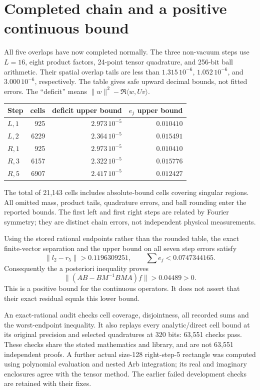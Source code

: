 \documentclass[11pt,a4paper]{article}
\begin{document}
\newpage
\section{Completed chain and a positive continuous bound}
All five overlaps have now completed normally. The three non-vacuum
steps use $L=16$, eight product factors, 24-point tensor quadrature,
and 256-bit ball arithmetic. Their spatial overlap tails are less
than $1.315\,10^{-6}$, $1.052\,10^{-6}$, and $3.000\,10^{-6}$,
respectively. The table gives safe upward decimal bounds, not fitted
errors. The ``deficit'' means $\|w\|^2-\Re\langle w,Uv\rangle$.
\begin{center}
\begin{tabular}{lrrr}
\toprule
Step & cells & deficit upper bound & $e_j$ upper bound\\
\midrule
$L,1$ & 925  & $2.973\,10^{-5}$ & $0.010410$\\
$L,2$ & 6229 & $2.364\,10^{-5}$ & $0.015491$\\
$R,1$ & 925  & $2.973\,10^{-5}$ & $0.010410$\\
$R,3$ & 6157 & $2.322\,10^{-5}$ & $0.015776$\\
$R,5$ & 6907 & $2.417\,10^{-5}$ & $0.012427$\\
\bottomrule
\end{tabular}
\end{center}
The total of 21,143 cells includes absolute-bound cells covering
singular regions. All omitted mass, product tails, quadrature errors,
and ball rounding enter the reported bounds. The first left and first
right steps are related by Fourier symmetry; they are distinct chain
errors, not independent physical measurements.

Using the stored rational endpoints rather than the rounded table,
the exact finite-vector separation and the upper bound on all seven
step errors satisfy
\[
 \|l_2-r_5\|>0.1196309251,\qquad
 \sum e_j<0.0747344165.
\]
Consequently the a posteriori inequality proves
\[
 \boxed{\ \|(AB-BM^{-1}BMA)f\|>0.04489>0.\ }
\]
This is a positive bound for the continuous operators. It does not
assert that their exact residual equals this lower bound.

An exact-rational audit checks cell coverage, disjointness, all
recorded sums and the worst-endpoint inequality. It also replays
every analytic/direct cell bound at its original precision and
selected quadratures at 320 bits: 63,551 checks pass. These checks
share the stated mathematics and library, and are not 63,551
independent proofs. A further actual size-128 right-step-5 rectangle
was computed using polynomial evaluation and nested Arb integration;
its real and imaginary enclosures agree with the tensor method.
The earlier failed development checks are retained with their fixes.
\end{document}
